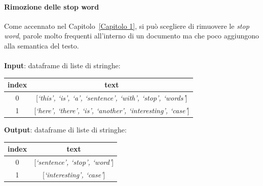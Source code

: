 \documentclass[12pt]{report}
\theoremstyle{definition}
\begin{document}
\paragraph{Rimozione delle stop word}
Come accennato nel Capitolo~\ref{Capitolo 1}, si può scegliere di rimuovere le \textit{stop word}, parole molto frequenti all'interno di un documento ma che poco aggiungono alla semantica del testo.
\\
\\
\textbf{Input}: dataframe di liste di stringhe:
\begin{center}
    \begin{tabular}{|c|c|}
    \hline
    \textbf{index} & \textbf{text} \\
    \hline
         0 & [\textit{`this', `is', `a', `sentence', `with', `stop', `words'}]\\
         1 & [\textit{`here', `there', `is', `another', `interesting', `case'}]\\
    \hline
    \end{tabular}
\end{center}
\textbf{Output}: dataframe di liste di stringhe:
\begin{center}
    \begin{tabular}{|c|c|}
    \hline
    \textbf{index} & \textbf{text} \\
    \hline
         0 & [\textit{`sentence', `stop', `word'}]\\
         1 & [\textit{`interesting', `case'}]\\
    \hline
    \end{tabular}
\end{center}
\end{document}
